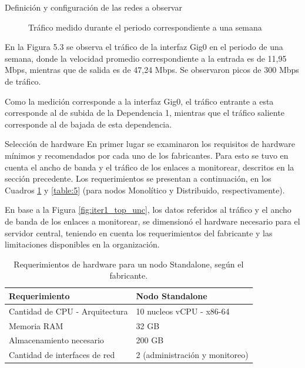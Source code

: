 \begin{subsection}{Definición y configuración de las redes a observar}
\begin{figure}[H]
    \caption{Tráfico medido durante el periodo correspondiente a una semana}
    \label{fig:figura_36_trafico_semana}
    \end{figure}
    \FloatBarrier
    En la Figura 5.3 se observa el tráfico de la interfaz Gig0 en el periodo de una semana, donde la velocidad promedio correspondiente a la entrada es de 11,95 Mbps, mientras que de salida es de 47,24 Mbps. Se observaron picos de 300 Mbps de tráfico.\par
    Como la medición corresponde a la interfaz Gig0, el tráfico entrante a esta corresponde al de subida de la Dependencia 1, mientras que el tráfico saliente corresponde al de bajada de esta dependencia.
    \end{subsection}
    \begin{subsection}{Selección de hardware}
    \label{seleccion_hw}
    En primer lugar se examinaron los requisitos de hardware mínimos y recomendados por cada uno de los fabricantes. Para esto se tuvo en cuenta el ancho de banda y el tráfico de los enlaces a monitorear, descritos en la sección precedente. Los requerimientos se presentan a continuación, en los Cuadros \ref{table:15} y \ref{table:5} (para nodos Monolítico y Distribuido, respectivamente). \par
    En base a la Figura \ref{fig:iter1_top_unc}, los datos referidos al tráfico y el ancho de banda de los enlaces a monitorear, se dimensionó el hardware necesario para el servidor central, teniendo en cuenta los requerimientos del fabricante y las limitaciones disponibles en la organización.\par
    \begin{table}[H]
    \centering
    \begin{tabular}{|m{10em}|m{10em}|}
    \hline 
    Requerimiento  & Nodo Standalone \\ 
    \hline
    Cantidad de CPU - Arquitectura &  10 nucleos vCPU - x86-64  \\ \hline
    Memoria RAM  &  32 GB  \\ 
    \hline
    Almacenamiento necesario   & 200 GB  \\
    \hline
    Cantidad de interfaces de red  & 2 (administración y monitoreo) \\
    \hline %
    \end{tabular}
    \caption{Requerimientos de hardware para un nodo Standalone, según el fabricante.}
    \label{table:15}
    \end{table}

\end{subsection}
